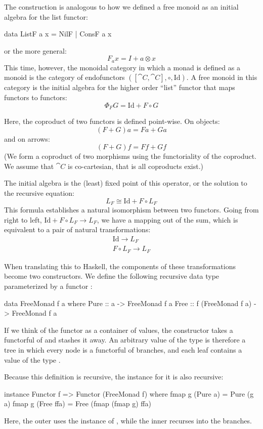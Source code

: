 \documentclass[DaoFP]{subfiles}
\begin{document}
The construction is analogous to how we defined a free monoid as an initial algebra for the list functor:
\begin{haskell}
data ListF a x = NilF | ConsF a x
\end{haskell}
or the more general:
\[ F_a x = I + a \otimes x \]
This time, however, the monoidal category in which a monad is defined as a monoid is the category of endofunctors $([\cat C, \cat C], \circ, \text{Id})$. A free monoid in this category is the initial algebra for the higher order ``list'' functor that maps functors to functors:
\[ \Phi_F G = \text{Id} + F \circ G \]

Here, the coproduct of two functors is defined point-wise. On objects:
\[ (F + G) a = F a + G a \]
and on arrows:
\[ (F + G) f = F f + G f \]
(We form a coproduct of two morphisms using the functoriality of the coproduct. We assume that $\cat C$ is co-cartesian, that is all coproducts exist.)

The initial algebra is the (least) fixed point of this operator, or the solution to the recursive equation:
\[ L_F \cong \text{Id} + F \circ L_F \]
This formula establishes a natural isomorphism between two functors. Going from right to left, $\text{Id} + F \circ L_F \to L_F$, we have a mapping out of the sum, which is equivalent to a pair of natural transformations:
\begin{align*}
\text{Id} \to L_F
\\
F \circ L_F \to L_F
\end{align*}

When translating this to Haskell, the components of these transformations become two constructors. We define the following recursive data type parameterized by a functor :
\begin{haskell}
data FreeMonad f a where
   Pure :: a -> FreeMonad f a
   Free :: f (FreeMonad f a) -> FreeMonad f a
\end{haskell}

If we think of the functor  as a container of values, the constructor  takes a functorful of  and stashes it away. An arbitrary value of the type  is therefore a tree in which every node is a functorful of branches, and each leaf contains a value of the type .

Because this definition is recursive, the  instance for it is also recursive:
\begin{haskell}
instance Functor f => Functor (FreeMonad f) where
  fmap g (Pure a) = Pure (g a)
  fmap g (Free ffa) = Free (fmap (fmap g) ffa)
\end{haskell}
Here, the outer  uses the  instance of , while the inner  recurses into the branches.
\end{document}
